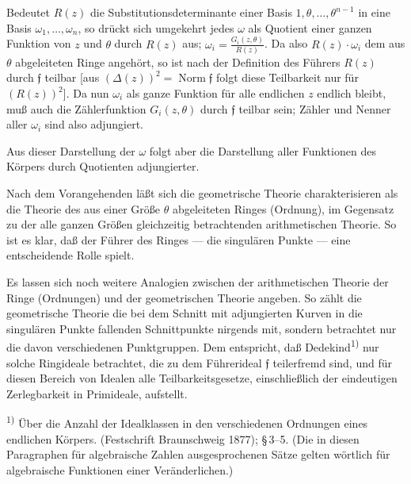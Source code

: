 \documentclass[12pt,a4paper]{article}
\begin{document}
Bedeutet $R(z)$ die Substitutionsdeterminante einer Basis $1,\theta,\ldots,\theta^{n-1}$ in eine Basis $\omega_{1},\ldots,\omega_{n}$, so dr\"uckt sich umgekehrt jedes $\omega$ als Quotient einer ganzen Funktion von $z$ und $\theta$ durch $R(z)$ aus; $\omega_{i}=\frac{G_{i}(z,\theta)}{R(z)}$. Da also $R(z)\cdot\omega_{i}$ dem aus $\theta$ abgeleiteten Ringe angeh\"ort, so ist nach der Definition des F\"uhrers $R(z)$ durch $\mathfrak{f}$ teilbar [aus $(\varDelta(z))^{2}=\operatorname{Norm}\mathfrak{f}$ folgt diese Teilbarkeit nur f\"ur $(R(z))^{2}$]. Da nun $\omega_{i}$ als ganze Funktion f\"ur alle endlichen $z$ endlich bleibt, mu\ss{} auch die Z\"ahlerfunktion $G_{i}(z,\theta)$ durch $\mathfrak{f}$ teilbar sein; Z\"ahler und Nenner aller $\omega_{i}$ sind also adjungiert.

Aus dieser Darstellung der $\omega$ folgt aber die Darstellung aller Funktionen des K\"orpers durch Quotienten adjungierter.

Nach dem Vorangehenden l\"a\ss{}t sich die geometrische Theorie charakterisieren als die Theorie des aus einer Gr\"o\ss{}e $\theta$ abgeleiteten Ringes (Ordnung), im Gegensatz zu der alle ganzen Gr\"o\ss{}en gleichzeitig betrachtenden arithmetischen Theorie. So ist es klar, da\ss{} der F\"uhrer des Ringes --- die singul\"aren Punkte --- eine entscheidende Rolle spielt.

Es lassen sich noch weitere Analogien zwischen der arithmetischen Theorie der Ringe (Ordnungen) und der geometrischen Theorie angeben. So z\"ahlt die geometrische Theorie die bei dem Schnitt mit adjungierten Kurven in die singul\"aren Punkte fallenden Schnittpunkte nirgends mit, sondern betrachtet nur die davon verschiedenen Punktgruppen. Dem entspricht, da\ss{} Dedekind\textsuperscript{1)} nur solche Ringideale betrachtet, die zu dem F\"uhrerideal $\mathfrak{f}$ teilerfremd sind, und f\"ur diesen Bereich von Idealen alle Teilbarkeitsgesetze, einschlie\ss{}lich der eindeutigen Zerlegbarkeit in Primideale, aufstellt.

\smallskip
\noindent\textsuperscript{1)} \"Uber die Anzahl der Idealklassen in den verschiedenen Ordnungen eines endlichen K\"orpers. (Festschrift Braunschweig 1877); \S\,3--5. (Die in diesen Paragraphen f\"ur algebraische Zahlen ausgesprochenen S\"atze gelten w\"ortlich f\"ur algebraische Funktionen einer Ver\"anderlichen.)
\end{document}
